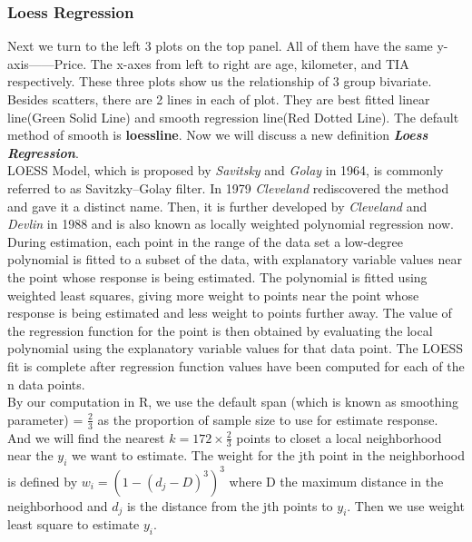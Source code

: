 \documentclass[a4paper]{article}
\begin{document}
\subsubsection{Loess Regression}
Next we turn to the left 3 plots on the top panel. All of them have the same y-axis——Price. The x-axes from left to right are age, kilometer, and TIA respectively. These three plots show us the relationship of 3 group bivariate. Besides scatters, there are 2 lines in each of plot. They are best fitted linear line(Green Solid Line) and smooth regression line(Red Dotted Line). The default method of smooth is \textbf{loessline}. Now we will discuss a new definition \textit{\textbf{Loess Regression}}.\\

\noindent
LOESS Model, which is proposed by \textit{Savitsky} and \textit{Golay} in 1964, is commonly referred to as Savitzky–Golay filter. In 1979 \textit{Cleveland} rediscovered the method and gave it a distinct name. Then, it is further developed by \textit{Cleveland} and \textit{Devlin} in 1988 and is also known as locally weighted polynomial regression now.\\

\noindent
During estimation, each point in the range of the data set a low-degree polynomial is fitted to a subset of the data, with explanatory variable values near the point whose response is being estimated. The polynomial is fitted using weighted least squares, giving more weight to points near the point whose response is being estimated and less weight to points further away. The value of the regression function for the point is then obtained by evaluating the local polynomial using the explanatory variable values for that data point. The LOESS fit is complete after regression function values have been computed for each of the n data points.\\

\noindent
By our computation in R, we use the default span (which is known as smoothing parameter) = $\frac{2}{3}$ as the proportion of sample size to use for estimate response. And we will find the nearest $k=172 \times \frac{2}{3}$ points to closet a local neighborhood near the $y_i$ we want to estimate. The weight for the jth point in the neighborhood is defined by $w_i = (1-(d_j-D)^3)^3$ where D the maximum distance in the neighborhood and $d_j$ is the distance from the jth points to $y_i$. Then we use weight least square to estimate $y_i$. \\
\end{document}
